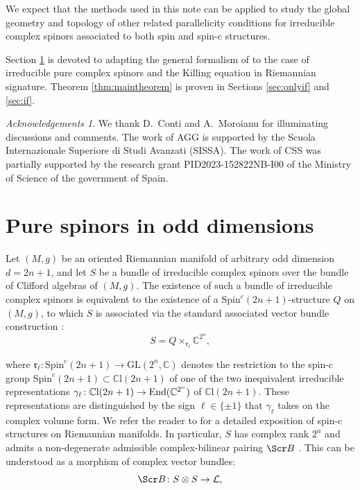 \documentclass[10pt,a4paper,twoside,reqno]{amsart}
\theoremstyle{plain}
\theoremstyle{definition}
\theoremstyle{remark}
\newtheorem*{ack}{Acknowledgements}
\def\C{\mathbb{C}}
\def\scB{\Scr B}
\def\Spin{\mathrm{Spin}}
\def\Spin{\mathrm{Spin}}
\def\mCl{\mathbb{C}\mathrm{l}}
\begin{document}
We expect that the methods used in this note can be applied to study the global geometry and topology of other related parallelicity conditions for irreducible complex spinors associated to both spin and spin-c structures.\medskip

Section \ref{sec:purespinors} is devoted to adapting the general formalism of \cite{Algebraic_Complex_Square_2025,Complex_Differential_Spinors_2026} to the case of irreducible pure complex spinors and the Killing equation in Riemannian signature. Theorem \ref{thm:maintheorem} is proven in Sections \ref{sec:onlyif} and \ref{sec:if}.

\begin{ack}
We thank D.\ Conti and A.\ Moroianu for illuminating discussions and comments. The work of AGG is supported by the Scuola Internazionale Superiore di Studi Avanzati (SISSA). The work of CSS was partially supported by the research grant PID2023-152822NB-I00 of the Ministry of Science of the government of Spain. 
\end{ack}


\section{Pure spinors in odd dimensions}
\label{sec:purespinors}


Let $(M,g)$ be an oriented Riemannian manifold of arbitrary odd dimension $d = 2n + 1$, and let $S$ be a bundle of irreducible complex spinors over the bundle of Clifford algebras of $(M,g)$. The existence of such a bundle of irreducible complex spinors is equivalent to the existence of a $\mathrm{Spin}^c(2n+1)$-structure $Q$ on $(M,g)$, to which $S$ is associated via the standard associated vector bundle construction \cite{LS18}:
\begin{equation*}
S = Q\times_{\mathfrak{r}_{\ell}} \mathbb{C}^{2^n},
\end{equation*}

\noindent
where $\mathfrak{r}_{\ell}\colon \Spin^c(2n+1) \to \mathrm{GL}(2^n,\C)$ denotes the restriction to the spin-c group $\Spin^c(2n+1) \subset \mCl(2n+1)$ of one of the two inequivalent irreducible representations $\gamma_{\ell}\colon\C\mathrm{l}(2n+1)\to\mathrm{End}(\smash{\mathbb{C}^{2^n}})$ of $\C\mathrm{l}(2n+1)$. These representations are distinguished by the sign $\ell\in\{\pm1\}$ that $\gamma_{\ell}$ takes on the complex volume form.  We refer the reader to \cite[Sec.~2.4]{Friedrich2000} for a detailed exposition of spin-c structures on Riemannian manifolds. In particular, $S$ has complex rank $2^n$ and admits a non-degenerate admissible complex-bilinear pairing $\scB$ \cite{AC97,ACDVP05}. This can be understood as a morphism of complex vector bundles:
\begin{equation*}
\scB \colon S\otimes S \to \mathcal{L},
\end{equation*}
\end{document}
